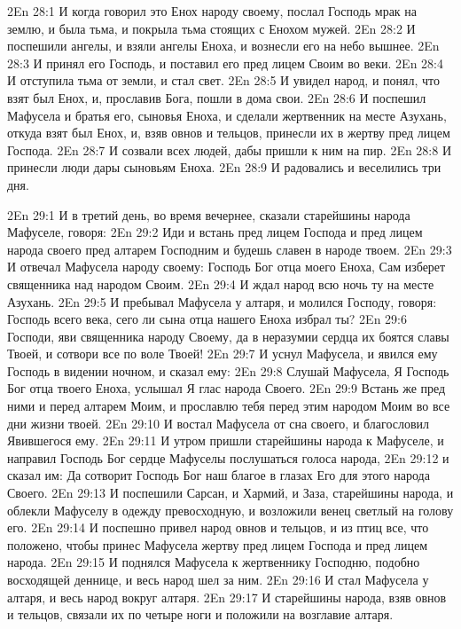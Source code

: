 \vs 2En 28:1
И когда говорил это Енох народу своему, послал Господь мрак на землю, и была тьма, и покрыла тьма стоящих с Енохом мужей.
\vs 2En 28:2
И поспешили ангелы, и взяли ангелы Еноха, и вознесли его на небо вышнее.
\vs 2En 28:3
И принял его Господь, и поставил его пред лицем Своим во веки.
\vs 2En 28:4
И отступила тьма от земли, и стал свет.
\vs 2En 28:5
И увидел народ, и понял, что взят был Енох, и, прославив Бога, пошли в дома свои.
\vs 2En 28:6
И поспешил Мафусела и братья его, сыновья Еноха, и сделали жертвенник на месте Азухань, откуда взят был Енох, и, взяв овнов и тельцов, принесли их в жертву пред лицем Господа.
\vs 2En 28:7
И созвали всех людей, дабы пришли к ним на пир.
\vs 2En 28:8
И принесли люди дары сыновьям Еноха.
\vs 2En 28:9
И радовались и веселились три дня.

\vs 2En 29:1
И в третий день, во время вечернее, сказали старейшины народа Мафуселе, говоря:
\vs 2En 29:2
Иди и встань пред лицем Господа и пред лицем народа своего пред алтарем Господним и будешь славен в народе твоем.
\vs 2En 29:3
И отвечал Мафусела народу своему: Господь Бог отца моего Еноха, Сам изберет священника над народом Своим.
\vs 2En 29:4
И ждал народ всю ночь ту на месте Азухань.
\vs 2En 29:5
И пребывал Мафусела у алтаря, и молился Господу, говоря: Господь всего века, сего ли сына отца нашего Еноха избрал ты?
\vs 2En 29:6
Господи, яви священника народу Своему, да в неразумии сердца их боятся славы Твоей, и сотвори все по воле Твоей!
\vs 2En 29:7
И уснул Мафусела, и явился ему Господь в видении ночном, и сказал ему:
\vs 2En 29:8
Слушай Мафусела, Я Господь Бог отца твоего Еноха, услышал Я глас народа Своего.
\vs 2En 29:9
Встань же пред ними и перед алтарем Моим, и прославлю тебя перед этим народом Моим во все дни жизни твоей.
\vs 2En 29:10
И востал Мафусела от сна своего, и благословил Явившегося ему.
\vs 2En 29:11
И утром пришли старейшины народа к Мафуселе, и направил Господь Бог сердце Мафуселы послушаться голоса народа,
\vs 2En 29:12
и сказал им: Да сотворит Господь Бог наш благое в глазах Его для этого народа Своего.
\vs 2En 29:13
И поспешили Сарсан, и Хармий, и Заза, старейшины народа, и облекли Мафуселу в одежду превосходную, и возложили венец светлый на голову его.
\vs 2En 29:14
И поспешно привел народ овнов и тельцов, и из птиц все, что положено, чтобы принес Мафусела жертву пред лицем Господа и пред лицем народа.
\vs 2En 29:15
И поднялся Мафусела к жертвеннику Господню, подобно восходящей деннице, и весь народ шел за ним.
\vs 2En 29:16
И стал Мафусела у алтаря, и весь народ вокруг алтаря.
\vs 2En 29:17
И старейшины народа, взяв овнов и тельцов, связали их по четыре ноги и положили на возглавие алтаря.
